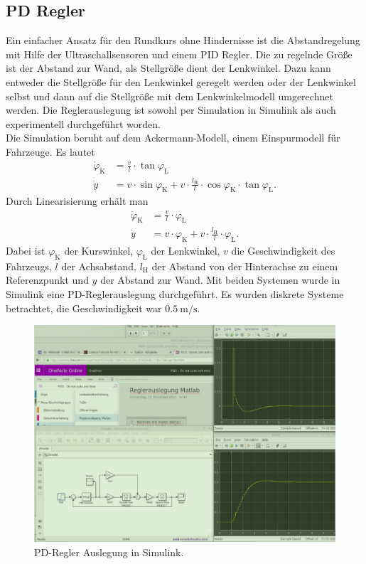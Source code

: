 \subsection{PD Regler}
\label{subsec:02PDregler}

Ein einfacher Ansatz f\"ur den Rundkurs ohne Hindernisse ist die Abstandregelung mit Hilfe der Ultraschallsensoren und einem PID Regler. Die zu regelnde Gr\"o\ss{}e ist der Abstand zur Wand, als Stellgr\"o\ss{}e dient der Lenkwinkel. Dazu kann entweder die Stellgr\"o\ss{}e f\"ur den Lenkwinkel geregelt werden oder der Lenkwinkel selbst und dann auf die Stellgr\"o\ss{}e mit dem Lenkwinkelmodell umgerechnet werden. Die Reglerauslegung ist sowohl per Simulation in Simulink als auch experimentell durchgef\"uhrt worden. \\
Die Simulation beruht auf dem Ackermann-Modell, einem Einspurmodell f\"ur Fahrzeuge. Es lautet
\begin{align} %
	\dot{\varphi}_\text{K} &= \frac{v}{l}\cdot\tan\varphi_\text{L}\\
	\dot{y} &= v \cdot \sin \varphi_\text{K}+v\cdot\frac{l_\text{H}}{l}\cdot\cos\varphi_\text{K}\cdot\tan\varphi_\text{L}.
\end{align}
Durch Linearisierung erh\"alt man
\begin{align}
	\dot{\varphi}_\text{K} &= \frac{v}{l}\cdot\varphi_\text{L}\\
	\dot{y} &= v\cdot\varphi_\text{K}+v\cdot\frac{l_\text{H}}{l}\cdot\varphi_\text{L}.
\end{align}
Dabei ist $\varphi_\text{K}$ der Kurswinkel, $\varphi_\text{L}$ der Lenkwinkel, $v$ die Geschwindigkeit des Fahrzeugs, $l$ der Achsabstand, $l_\text{H}$ der Abstand von der Hinterachse zu einem Referenzpunkt und $y$ der Abstand zur Wand. Mit beiden Systemen wurde in Simulink eine PD-Reglerauslegung durchgef\"uhrt. Es wurden diskrete Systeme betrachtet, die Geschwindigkeit war $\SI[per-mode=fraction]{0.5}{\meter\per\second}$.
\begin{figure}[h] %
	\centering
	\includegraphics[width=0.7\linewidth]{pics/simulink}
	\caption{PD-Regler Auslegung in Simulink.}
	\label{fig:simulinkPD}
\end{figure}

